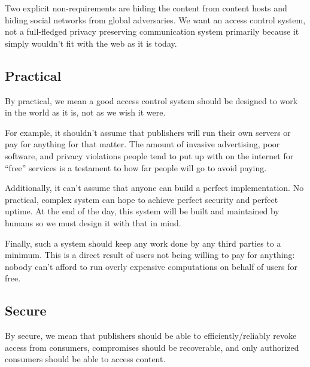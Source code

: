 \documentclass[pdftex,12pt,a4papaer]{report}
\begin{document}
Two explicit non-requirements are hiding the content from content hosts and
hiding social networks from global adversaries. We want an access control
system, not a full-fledged privacy preserving communication system primarily
because it simply wouldn't fit with the web as it is today.


\subsection{Practical}

By practical, we mean a good access control system should be designed to work in
the world as it is, not as we wish it were.

For example, it shouldn't assume that publishers will run their own servers or
pay for anything for that matter. The amount of invasive advertising, poor
software, and privacy violations people tend to put up with on the internet for
``free'' services is a testament to how far people will go to avoid paying.

Additionally, it can't assume that anyone can build a perfect implementation. No
practical, complex system can hope to achieve perfect security and perfect
uptime. At the end of the day, this system will be built and maintained by
humans so we must design it with that in mind.

Finally, such a system should keep any work done by any third parties to a
minimum. This is a direct result of users not being willing to pay for anything:
nobody can't afford to run overly expensive computations on behalf of users for
free.

\subsection{Secure}

By secure, we mean that publishers should be able to efficiently/reliably revoke
access from consumers, compromises should be recoverable, and only authorized
consumers should be able to access content.
\end{document}
